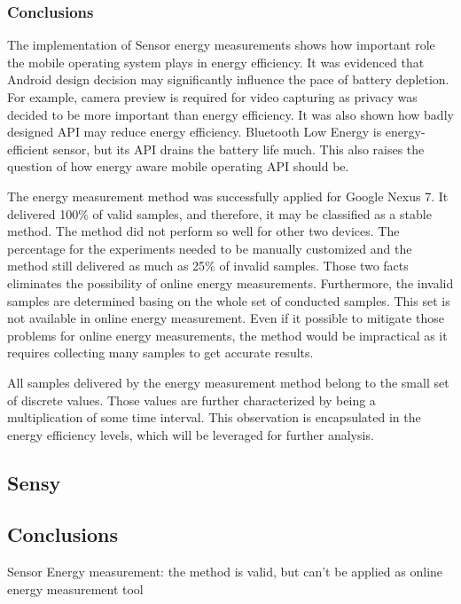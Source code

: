    
\subsubsection{Conclusions}   
The implementation of Sensor energy measurements shows how important role the mobile operating system plays in energy efficiency. It was evidenced that Android design decision may significantly influence the pace of battery depletion. For example, camera preview is required for video capturing as privacy was decided to be more important than energy efficiency. It was also shown how badly designed API may reduce energy efficiency. Bluetooth Low Energy is energy-efficient sensor, but its API drains the battery life much. This also raises the question of how energy aware mobile operating API should be.

The energy measurement method was successfully applied for Google Nexus 7. It delivered 100\% of valid samples, and therefore, it may be classified as a stable method. The method did not perform so well for other two devices. The percentage for the experiments needed to be manually customized and the method still delivered as much as 25\% of invalid samples. Those two facts eliminates the possibility of online energy measurements. Furthermore, the invalid samples are determined basing on the whole set of conducted samples. This set is not available in online energy measurement. Even if it possible to mitigate those problems for online energy measurements, the method would be impractical as it requires collecting many samples to get accurate results.  

All samples delivered by the energy measurement method belong to the small set of discrete values. Those values are further characterized by being a multiplication of some time interval. This observation is encapsulated in the energy efficiency levels, which will be leveraged for further analysis. 

\subsection{Sensy}
\subsection{Conclusions}
Sensor Energy measurement:
	the method is valid, but can't be applied as online energy measurement tool